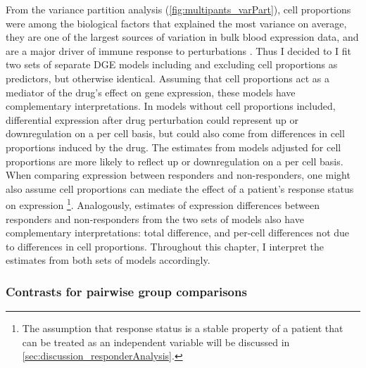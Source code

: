 From the variance partition analysis (\cref{fig:multipants_varPart}), cell proportions were among the biological factors that explained the most variance on average,
they are one of the largest sources of variation in bulk blood expression data, 
and are a major driver of immune response to perturbations \autocite{piasecka2018DistinctiveRolesAge}.
Thus I decided to I fit two sets of separate \gls{DGE} models including and excluding cell proportions as predictors, but otherwise identical.
Assuming that cell proportions act as a mediator of the drug's effect on gene expression, these models have complementary interpretations.
In models without cell proportions included, differential expression after drug perturbation could represent up or downregulation on a per cell basis, 
but could also come from differences in cell proportions induced by the drug.
The estimates from models adjusted for cell proportions are more likely to reflect up or downregulation on a per cell basis.
When comparing expression between responders and non-responders,
one might also assume cell proportions can mediate the effect of a patient's response status on expression%
\footnote{
    The assumption that response status is a stable property of a patient that can be treated as an independent variable will be discussed in \cref{sec:discussion_responderAnalysis}.
}.
Analogously, estimates of expression differences between responders and non-responders from the two sets of models 
also have complementary interpretations: total difference, and per-cell differences not due to differences in cell proportions.
Throughout this chapter, I interpret the estimates from both sets of models accordingly.


\subsubsection{Contrasts for pairwise group comparisons}

